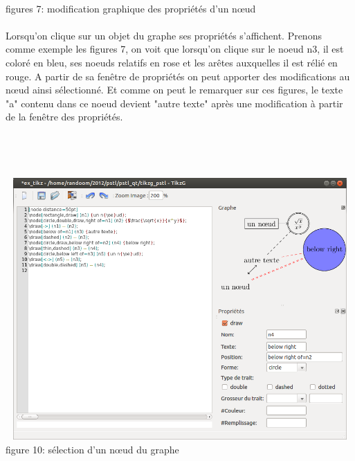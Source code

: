 \documentclass[a4paper]{report}
\begin{document}
\\ 
figures 7: modification graphique des propriétés d'un n{\oe}ud
\\
\\
Lorsqu'on clique sur un objet du graphe ses propriétés s'affichent. Prenons comme exemple les figures 7, on voit que lorsqu'on clique sur le noeud n3, il est coloré en bleu, ses noeuds relatifs en rose et les arêtes auxquelles il est rélié en rouge. A partir de sa fenêtre de propriétés on peut apporter des modifications au n{\oe}ud ainsi sélectionné. Et comme on peut le remarquer sur ces figures, le texte "a" contenu dans ce noeud devient "autre texte" après une modification à partir de la fenêtre des propriétés.
\\
\\
\\
\\
\\
  \includegraphics[width=15cm, height=10cm]{img/r_10.png}
\\ 
figure 10: sélection d'un n{\oe}ud du graphe
\end{document}

